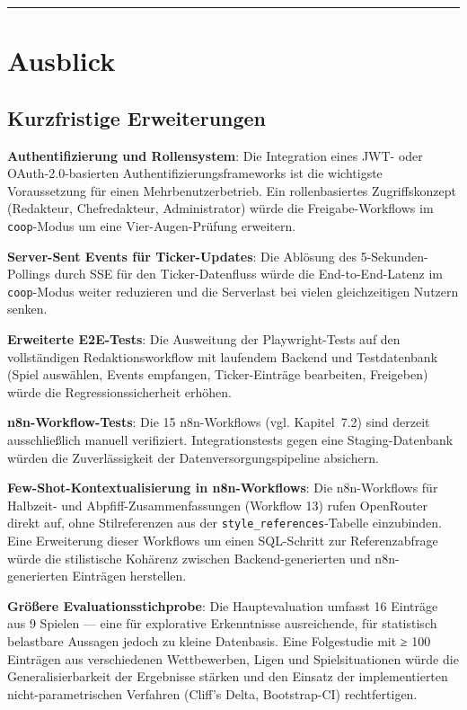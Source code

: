 \begin{center}\rule{0.5\linewidth}{0.5pt}\end{center}

\section{Ausblick}\label{ausblick}

\subsection{Kurzfristige
Erweiterungen}\label{kurzfristige-erweiterungen}

\textbf{Authentifizierung und Rollensystem}: Die Integration eines JWT-
oder OAuth-2.0-basierten Authentifizierungsframeworks ist die wichtigste
Voraussetzung für einen Mehrbenutzerbetrieb. Ein rollenbasiertes
Zugriffskonzept (Redakteur, Chefredakteur, Administrator) würde die
Freigabe-Workflows im \texttt{coop}-Modus um eine Vier-Augen-Prüfung
erweitern.

\textbf{Server-Sent Events für Ticker-Updates}: Die Ablösung des
5-Sekunden-Pollings durch SSE für den Ticker-Datenfluss würde die
End-to-End-Latenz im \texttt{coop}-Modus weiter reduzieren und die
Serverlast bei vielen gleichzeitigen Nutzern senken.

\textbf{Erweiterte E2E-Tests}: Die Ausweitung der Playwright-Tests auf
den vollständigen Redaktionsworkflow mit laufendem Backend und
Testdatenbank (Spiel auswählen, Events empfangen, Ticker-Einträge
bearbeiten, Freigeben) würde die Regressionssicherheit erhöhen.

\textbf{n8n-Workflow-Tests}: Die 15 n8n-Workflows (vgl. Kapitel~7.2)
sind derzeit ausschließlich manuell verifiziert. Integrationstests gegen
eine Staging-Datenbank würden die Zuverlässigkeit der
Datenversorgungspipeline absichern.

\textbf{Few-Shot-Kontextualisierung in n8n-Workflows}: Die n8n-Workflows
für Halbzeit- und Abpfiff-Zusammenfassungen (Workflow 13) rufen
OpenRouter direkt auf, ohne Stilreferenzen aus der
\texttt{style\_references}-Tabelle einzubinden. Eine Erweiterung dieser
Workflows um einen SQL-Schritt zur Referenzabfrage würde die
stilistische Kohärenz zwischen Backend-generierten und n8n-generierten
Einträgen herstellen.

\textbf{Größere Evaluationsstichprobe}: Die Hauptevaluation umfasst 16
Einträge aus 9 Spielen --- eine für explorative Erkenntnisse
ausreichende, für statistisch belastbare Aussagen jedoch zu kleine
Datenbasis. Eine Folgestudie mit ≥ 100 Einträgen aus verschiedenen
Wettbewerben, Ligen und Spielsituationen würde die Generalisierbarkeit
der Ergebnisse stärken und den Einsatz der implementierten
nicht-parametrischen Verfahren (Cliff's Delta, Bootstrap-CI)
rechtfertigen.

